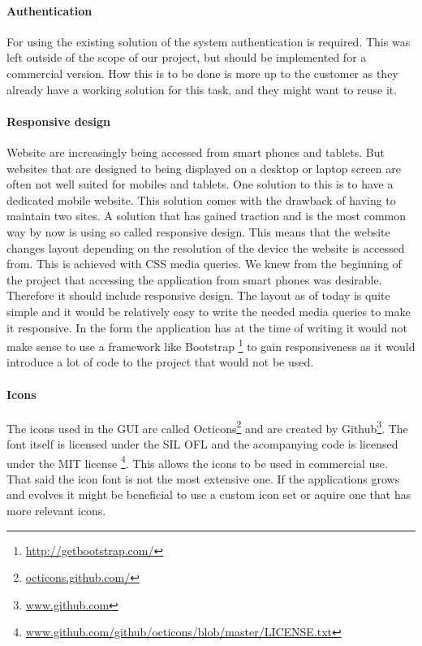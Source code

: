 \documentclass[11pt,a4paper,titlepage,oneside]{report}
\begin{document}
\paragraph{Authentication}
For using the existing solution of the system authentication is required. This was left outside of the scope of our project, but should be implemented for a commercial version. How this is to be done is more up to the customer as they already have a working solution for this task, and they might want to reuse it.

\paragraph{Responsive design}
Website are increasingly being accessed from smart phones and tablets. But websites that are designed to being displayed on a desktop or laptop screen are often not well suited for mobiles and tablets. One solution to this is to have a dedicated mobile website. This solution comes with the drawback of having to maintain two sites. A solution that has gained traction and is the most common way by now is using so called responsive design. This means that the website changes layout depending on the resolution of the device the website is accessed from. This is achieved with \gls{CSS} media queries.
We knew from the beginning of the project that accessing the application from smart phones was desirable. Therefore it should include responsive design. The layout as of today is quite simple and it would be relatively easy to write the needed media queries to make it responsive. In the form the application has at the time of writing it would not make sense to use a framework like Bootstrap \footnote{\url{http://getbootstrap.com/}} to gain responsiveness as it would introduce a lot of code to the project that would not be used. 

\paragraph{Icons}
The icons used in the GUI are called Octicons\footnote{\url{octicons.github.com/}} and are created by Github\footnote{\url{www.github.com}}. The font itself is licensed under the SIL OFL and the acompanying code is licensed under the MIT license \footnote{\url{www.github.com/github/octicons/blob/master/LICENSE.txt}}. This allows the icons to be used in commercial use. That said the icon font is not the most extensive one. If the applications grows and evolves it might be beneficial to use a custom icon set or aquire one that has more relevant icons.
\end{document}
